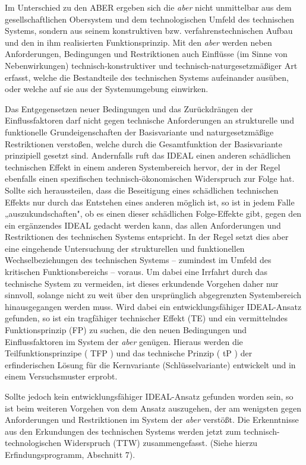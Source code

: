 \documentclass[12pt,a4paper]{article}
\begin{document}
Im Unterschied zu den ABER ergeben sich die \emph{aber} nicht unmittelbar aus
dem gesellschaftlichen Obersystem und dem technologischen Umfeld des
technischen Systems, sondern aus seinem konstruktiven
bzw. verfahrenstechnischen Aufbau und den in ihm realisierten
Funktionsprinzip. Mit den \emph{aber} werden neben Anforderungen, Bedingungen
und Restriktionen auch Einflüsse (im Sinne von Nebenwirkungen)
technisch-konstruktiver und technisch-naturgesetzmäßiger Art erfasst, welche
die Bestandteile des technischen Systems aufeinander ausüben, oder welche auf
sie aus der Systemumgebung einwirken.

Das Entgegensetzen neuer Bedingungen und das Zurückdrängen der
Einflussfaktoren darf nicht gegen technische Anforderungen an strukturelle und
funktionelle Grundeigenschaften der Basisvariante und naturgesetzmäßige
Restriktionen verstoßen, welche durch die Gesamtfunktion der Basisvariante
prinzipiell gesetzt sind. Andernfalls ruft das IDEAL einen anderen schädlichen
technischen Effekt in einem anderen Systembereich hervor, der in der Regel
ebenfalls einen spezifischen technisch-ökonomischen Widerspruch zur Folge
hat. Sollte sich heraussteilen, dass die Beseitigung eines schädlichen
technischen Effekts nur durch das Entstehen eines anderen möglich ist, so ist
in jedem Falle „auszukundschaften", ob es einen dieser schädlichen
Folge-Effekte gibt, gegen den ein ergänzendes IDEAL gedacht werden kann, das
allen Anforderungen und Restriktionen des technischen Systems entspricht. In
der Regel setzt dies aber eine eingehende Untersuchung der strukturellen und
funktionellen Wechselbeziehungen des technischen Systems -- zumindest im Umfeld
des kritischen Funktionsbereichs -- voraus. Um dabei eine Irrfahrt durch das
technische System zu vermeiden, ist dieses erkundende Vorgehen daher nur
sinnvoll, solange nicht zu weit über den ursprünglich abgegrenzten
Systembereich hinausgegangen werden muss. Wird dabei ein entwicklungsfähiger
IDEAL-Ansatz gefunden, so ist ein tragfähiger technischer Effekt (TE) und ein
vermittelndes Funktionsprinzip (FP) zu suchen, die den neuen Bedingungen und
Einflussfaktoren im System der \emph{aber} genügen. Hieraus werden die
Teilfunktionsprinzipe ( TFP ) und das technische Prinzip ( tP ) der
erfinderischen Lösung für die Kernvariante (Schlüsselvariante) entwickelt und
in einem Versuchsmuster erprobt.

Sollte jedoch kein entwicklungsfähiger IDEAL-Ansatz gefunden worden sein, so
ist beim weiteren Vorgehen von dem Ansatz auszugehen, der am wenigsten gegen
Anforderungen und Restriktionen im System der \emph{aber} verstößt. Die
Erkenntnisse aus den Erkundungen des technischen Systems werden jetzt zum
technisch-technologischen Widerspruch (TTW) zusammengefasst. (Siehe hierzu
Erfindungsprogramm, Abschnitt 7).
\end{document}
